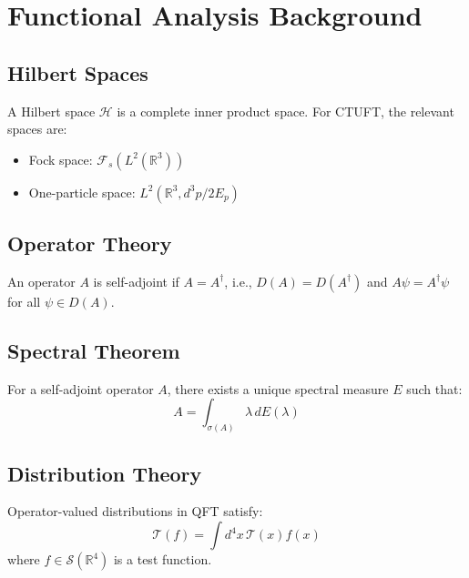 \section{Functional Analysis Background}
\label{app:functional_analysis}

\subsection{Hilbert Spaces}

A Hilbert space $\mathcal{H}$ is a complete inner product space. For CTUFT, the relevant spaces are:
\begin{itemize}
    \item Fock space: $\mathcal{F}_s(L^2(\mathbb{R}^3))$
    \item One-particle space: $L^2(\mathbb{R}^3, d^3p/2E_p)$
\end{itemize}

\subsection{Operator Theory}

\begin{definition}
An operator $A$ is self-adjoint if $A = A^\dagger$, i.e., $D(A) = D(A^\dagger)$ and $A\psi = A^\dagger\psi$ for all $\psi \in D(A)$.
\end{definition}

\subsection{Spectral Theorem}

\begin{theorem}
For a self-adjoint operator $A$, there exists a unique spectral measure $E$ such that:
\begin{equation}
    A = \int_{\sigma(A)} \lambda \, dE(\lambda)
\end{equation}
\end{theorem}

\subsection{Distribution Theory}

Operator-valued distributions in QFT satisfy:
\begin{equation}
    \mathcal{T}(f) = \int d^4x \, \mathcal{T}(x) f(x)
\end{equation}
where $f \in \mathcal{S}(\mathbb{R}^4)$ is a test function.
